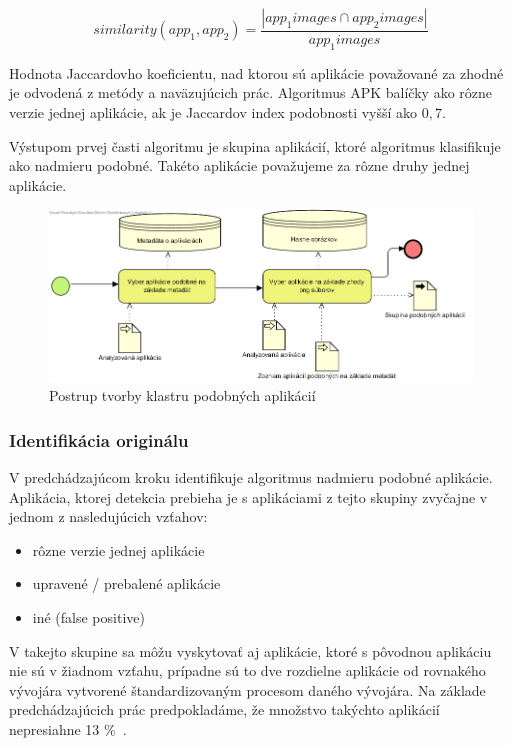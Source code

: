 \[ similarity(app_1, app_2) = \frac{|app_{1}images \cap app_{2}images|} { app_{1}images} \]

Hodnota Jaccardovho koeficientu, nad ktorou sú aplikácie považované za zhodné je odvodená z metódy  a naväzujúcich prác. Algoritmus APK balíčky ako rôzne verzie jednej aplikácie, ak je Jaccardov index podobnosti vyšší ako $0,7$.

Výstupom prvej časti algoritmu je skupina aplikácií, ktoré algoritmus klasifikuje ako nadmieru podobné. Takéto aplikácie považujeme za rôzne druhy jednej aplikácie.

\begin{figure}[htb]
  \begin{center}
    \includegraphics[width=130mm]{images/detection-cluster.png}
  \end{center}
  \caption{Postrup tvorby klastru podobných aplikácií}
  \label{fig:detectionClustering}
\end{figure}
\subsubsection{\textbf{Identifikácia originálu}} 
V predchádzajúcom kroku identifikuje algoritmus nadmieru podobné aplikácie. Aplikácia, ktorej detekcia prebieha je s aplikáciami z tejto skupiny zvyčajne v jednom z nasledujúcich vzťahov:
\begin{itemize}
	\item rôzne verzie jednej aplikácie
	\item upravené / prebalené aplikácie
	\item iné (false positive)
\end{itemize}
V takejto skupine sa môžu vyskytovať aj aplikácie, ktoré s pôvodnou aplikáciu nie sú v žiadnom vzťahu, prípadne sú to dve rozdielne aplikácie od rovnakého vývojára vytvorené štandardizovaným procesom daného vývojára. Na základe predchádzajúcich prác predpokladáme, že množstvo takýchto aplikácií nepresiahne 13 \%~\cite{Zhou2012}.

